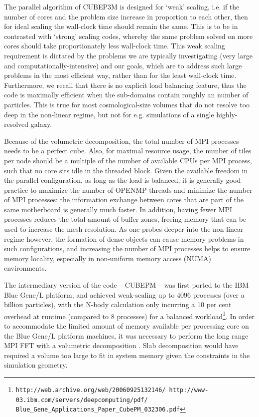 The parallel algorithm of {\small CUBEP3M} is designed for `weak' 
scaling, i.e. if the number of cores and the problem size 
increase in proportion to each other, then for ideal scaling the 
wall-clock time should remain the same. This is to be in contrasted with `strong' 
scaling codes, whereby the same problem solved on more cores should take 
proportionately less wall-clock time. This weak scaling requirement 
is dictated by the problems we are typically investigating (very 
large and computationally-intensive) and our goals, which are to 
address such large problems in the most efficient way, rather than 
for the least wall-clock time. Furthermore, we recall that there is no explicit 
load balancing feature, thus the code is maximally efficient when the sub-domains
contain roughly an  number of particles. This is true for most
cosmological-size volumes that do not resolve too deep in the non-linear regime, 
but not for e.g. simulations of a single highly-resolved galaxy. 

Because of the volumetric decomposition, the total number of {\small MPI} processes needs
to be a perfect cube. Also, for maximal resource usage, the number of tiles per node 
should be a multiple of the number of available {\small CPU}s per {\small MPI} process,
such that no core sits idle in the threaded block.
Given the available freedom in the parallel configuration, as long as the load is balanced, it is generally good practice to maximize the number of {\small OPENMP} threads and minimize the number of {\small MPI} processes:
the information exchange between cores that are part of the same motherboard is generally much faster.
In addition, having fewer {\small MPI} processes reduces the total amount of buffer zones, 
freeing memory that can be used to increase the mesh resolution. 
As one probes deeper into the non-linear regime however, 
the formation of dense objects can cause memory problems in such configurations, and increasing 
the number of {\small MPI} processes helps to ensure memory locality,
especially in non-uniform memory access (NUMA) environments.




 The intermediary version of the code -- {\small CUBEPM} --
was first  ported to the IBM Blue Gene/L platform, and achieved 
weak-scaling up to 4096 processes (over a billion particles), with the N-body calculation only incurring a 10 per cent overhead 
at runtime (compared to 8 processes) for a balanced workload\footnote{\tt http://web.archive.org/web/20060925132146/ http://www-03.ibm.com/servers/deepcomputing/pdf/ Blue\_Gene\_Applications\_Paper\_CubePM\_032306.pdf}.  In order to 
accommodate the limited amount of memory available per processing core on the 
Blue Gene/L platform machines, it was necessary to perform the long range {\small MPI FFT}
with a volumetric decomposition \citep{3DFFT}.
Slab decomposition would have required a volume too large to fit in system 
memory given the constraints in the simulation geometry. 

